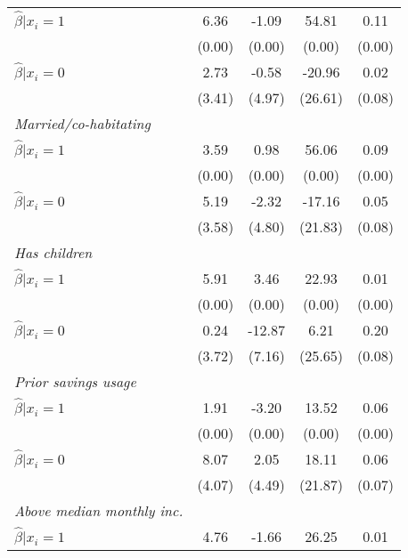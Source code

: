 \begin{table}[h]
{\begin{threeparttable}
\begin{tabular}{l*{4}{c}}
\hspace{0.5cm} \(\hat\beta|x_i=1\)&6.36\sym{*}&    -1.09&    54.81&     0.11\\
                &   (0.00)&   (0.00)&   (0.00)&   (0.00)\\
\hspace{0.5cm} \(\hat\beta|x_i=0\)&     2.73&    -0.58&   -20.96&     0.02\\
                &   (3.41)&   (4.97)&  (26.61)&   (0.08)\\
\textit{Married/co-habitating}&         &         &         &         \\
\hspace{0.5cm} \(\hat\beta|x_i=1\)&     3.59&     0.98&    56.06&     0.09\\
                &   (0.00)&   (0.00)&   (0.00)&   (0.00)\\
\hspace{0.5cm} \(\hat\beta|x_i=0\)&     5.19&    -2.32&   -17.16&     0.05\\
                &   (3.58)&   (4.80)&  (21.83)&   (0.08)\\
\textit{Has children}&         &         &         &         \\
\hspace{0.5cm} \(\hat\beta|x_i=1\)&5.91\sym{*}&     3.46&    22.93&     0.01\\
                &   (0.00)&   (0.00)&   (0.00)&   (0.00)\\
\hspace{0.5cm} \(\hat\beta|x_i=0\)&     0.24&-12.87\sym{*}&     6.21&0.20\sym{**}\\
                &   (3.72)&   (7.16)&  (25.65)&   (0.08)\\
\textit{Prior savings usage}&         &         &         &         \\
\hspace{0.5cm} \(\hat\beta|x_i=1\)&     1.91&    -3.20&    13.52&     0.06\\
                &   (0.00)&   (0.00)&   (0.00)&   (0.00)\\
\hspace{0.5cm} \(\hat\beta|x_i=0\)&8.07\sym{**}&     2.05&    18.11&     0.06\\
                &   (4.07)&   (4.49)&  (21.87)&   (0.07)\\
\textit{Above median monthly inc.}&         &         &         &         \\
\hspace{0.5cm} \(\hat\beta|x_i=1\)&     4.76&    -1.66&    26.25&     0.01\\

\end{tabular}
\end{threeparttable}}
\end{table}
